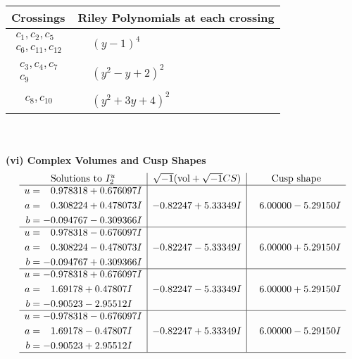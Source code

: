 \documentclass[1p]{elsarticle_modified}
\theoremstyle{definition}
\newcommand{\I}{\sqrt{-1}}
\begin{document}
\begin{tabular}{m{50pt}|m{274pt}}
Crossings & \hspace{64pt}Riley Polynomials at each crossing \\
\hline $$\begin{aligned}c_{1},c_{2},c_{5}\\c_{6},c_{11},c_{12}\end{aligned}$$&$\begin{aligned}
&(y-1)^4
\end{aligned}$\\
\hline $$\begin{aligned}c_{3},c_{4},c_{7}\\c_{9}\end{aligned}$$&$\begin{aligned}
&(y^2- y+2)^2
\end{aligned}$\\
\hline $$\begin{aligned}c_{8},c_{10}\end{aligned}$$&$\begin{aligned}
&(y^2+3 y+4)^2
\end{aligned}$\\
\hline
\end{tabular}\\~\\
\newpage\flushleft \textbf{(vi) Complex Volumes and Cusp Shapes}
$$\begin{array}{c|c|c}  
\text{Solutions to }I^u_{2}& \I (\text{vol} + \sqrt{-1}CS) & \text{Cusp shape}\\
 \hline 
\begin{aligned}
u &= \phantom{-}0.978318 + 0.676097 I \\
a &= \phantom{-}0.308224 + 0.478073 I \\
b &= -0.094767 - 0.309366 I\end{aligned}
 & -0.82247 + 5.33349 I & \phantom{-}6.00000 - 5.29150 I \\ \hline\begin{aligned}
u &= \phantom{-}0.978318 - 0.676097 I \\
a &= \phantom{-}0.308224 - 0.478073 I \\
b &= -0.094767 + 0.309366 I\end{aligned}
 & -0.82247 - 5.33349 I & \phantom{-}6.00000 + 5.29150 I \\ \hline\begin{aligned}
u &= -0.978318 + 0.676097 I \\
a &= \phantom{-}1.69178 + 0.47807 I \\
b &= -0.90523 - 2.95512 I\end{aligned}
 & -0.82247 - 5.33349 I & \phantom{-}6.00000 + 5.29150 I \\ \hline\begin{aligned}
u &= -0.978318 - 0.676097 I \\
a &= \phantom{-}1.69178 - 0.47807 I \\
b &= -0.90523 + 2.95512 I\end{aligned}
 & -0.82247 + 5.33349 I & \phantom{-}6.00000 - 5.29150 I\\
 \hline 
 \end{array}$$\newpage\newpage\renewcommand{\arraystretch}{1}
\end{document}
